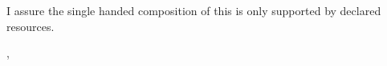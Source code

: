 \thispagestyle{empty}
\vspace*{0.8\textheight}
\noindent
I assure the single handed composition of this \MakeLowercase{\getDoctype{}} is only supported by declared resources.

\vspace{15mm}
\noindent
\getSubmissionLocation{}, \getSubmissionDate{} \hspace{5cm} \getAuthor{}

\cleardoublepage{}

